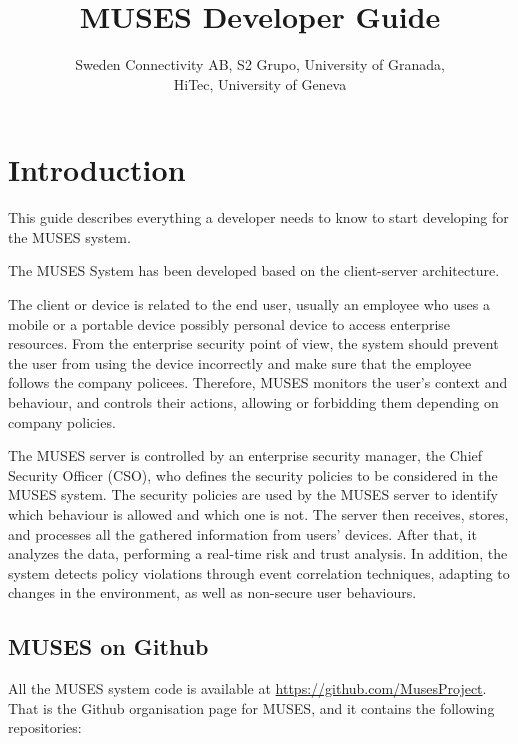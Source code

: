 \documentclass[a4paper,11pt]{book}
\title{MUSES Developer Guide}
\author{Sweden Connectivity AB, S2 Grupo, University of Granada, \\HiTec, University of Geneva}
\begin{document}
\maketitle
\tableofcontents

\chapter{Introduction}
\label{ch:intro}

This guide describes everything a developer needs to know to start developing for the MUSES system.

The MUSES System \cite{deliverable21} has been developed based on the client-server architecture. 
 
The client or device is related to the end user, usually an employee who uses a mobile or a portable device possibly
personal device to access enterprise resources. From the enterprise security point of view, the system should prevent the user from using the device incorrectly and make sure that the employee follows the company policees. Therefore, MUSES monitors the user's context and behaviour, and controls their actions, allowing or forbidding them depending on company policies.

The MUSES server is controlled by an enterprise security manager, the Chief Security Officer (CSO), who defines the security policies to be considered in the MUSES system. The security policies are used by the MUSES server to identify which behaviour is allowed and which one is not. The server then receives, stores, and processes all the gathered information from users' devices. After that, it analyzes the data, performing a real-time risk and trust analysis. In addition, the system detects policy violations through event correlation techniques, adapting to changes in the environment, as well as non-secure user behaviours.

\section{MUSES on Github}
\label{sec:musesgit}

All the MUSES system code is available at \url{https://github.com/MusesProject}. That is the Github organisation page for MUSES, and it contains the following repositories:
\end{document}
